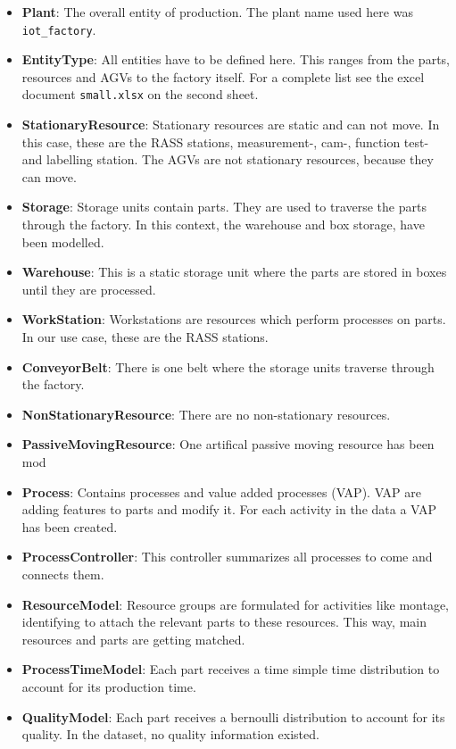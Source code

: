 \begin{itemize}
  \item \textbf{Plant}: The overall entity of production. The plant name used here was \texttt{iot\_factory}.
  \item \textbf{EntityType}: All entities have to be defined here. This ranges from the parts, resources and AGVs to the factory itself. For a complete list see the excel document \texttt{small.xlsx} on the second sheet.
  \item \textbf{StationaryResource}: Stationary resources are static and can not move. In this case, these are the RASS stations, measurement-, cam-, function test- and labelling station. The AGVs are not stationary resources, because they can move.
  \item \textbf{Storage}: Storage units contain parts. They are used to traverse the parts through the factory. In this context, the warehouse and box storage, have been modelled.
  \item \textbf{Warehouse}: This is a static storage unit where the parts are stored in boxes until they are processed.
  \item \textbf{WorkStation}: Workstations are resources which perform processes on parts. In our use case, these are the RASS stations.
  \item \textbf{ConveyorBelt}: There is one belt where the storage units traverse through the factory.
  \item \textbf{NonStationaryResource}: There are no non-stationary resources.
  \item \textbf{PassiveMovingResource}: One artifical passive moving resource has been mod
  \item \textbf{Process}: Contains processes and value added processes (VAP). VAP are adding features to parts and modify it. For each activity in the data a VAP has been created.
  \item \textbf{ProcessController}: This controller summarizes all processes to come and connects them.
  \item \textbf{ResourceModel}: Resource groups are formulated for activities like montage, identifying to attach the relevant parts to these resources. This way, main resources and parts are getting matched.
  \item \textbf{ProcessTimeModel}: Each part receives a time simple time distribution to account for its production time.
  \item \textbf{QualityModel}: Each part receives a bernoulli distribution to account for its quality. In the dataset, no quality information existed.

\end{itemize}
